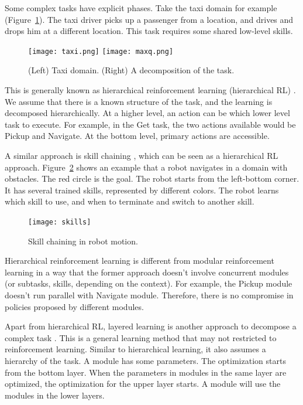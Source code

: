 \documentclass[12pt]{report}	%
\theoremstyle{definition}
\theoremstyle{remark}
\providecommand{\DIFadd}[1]{{\protect\color{blue}\uwave{#1}}} %
\providecommand{\DIFaddbegin}{} %
\providecommand{\DIFaddend}{} %
\begin{document}
Some complex tasks have explicit phases. Take the taxi domain for example
(Figure~\ref{fig:taxi}). The taxi driver picks up a passenger from a location,
and drives and drops him at a different location. This task requires some shared
low-level skills.

\begin{figure}[h]
\centering
\texttt{[image: taxi.png]}
\texttt{[image: maxq.png]}
\caption{(Left) Taxi domain. (Right) A decomposition of the task.}
\label{fig:taxi}
\end{figure}

This is generally known as hierarchical reinforcement learning (hierarchical RL)
\cite{dietterich2000hierarchical}.
We assume that there is a known structure of the task, and the
learning is decomposed hierarchically. At a higher level, an action can be
which lower level task to execute. For example, in the Get task, the two actions
available would be Pickup and Navigate. At the bottom level, primary actions are
accessible.

A similar approach is skill chaining \cite{konidaris2009skill}, which can
be seen as a hierarchical RL approach. Figure~\ref{fig:skills} shows
an example that a robot navigates in a domain with obstacles. The red circle is
the goal. The robot starts from the left-bottom corner. It has several trained
skills, represented by different colors. The robot learns which skill to use,
and when to terminate and switch to another skill.

\begin{figure}[h]
\centering
\texttt{[image: skills]}
\caption{Skill chaining in robot motion.}
\label{fig:skills}
\end{figure}

Hierarchical reinforcement learning is different from modular reinforcement
learning in a way that the former approach doesn't involve concurrent modules
(or subtasks, skills, depending on the context).
For example, the Pickup module doesn't run \DIFaddbegin \DIFadd{in }\DIFaddend parallel with Navigate module.
Therefore, there is no compromise in policies proposed by different modules.

Apart from hierarchical RL, layered learning is another approach to decompose a
complex task \cite{stone2000layered}. This is a general learning method that may
not \DIFaddbegin \DIFadd{be }\DIFaddend restricted to reinforcement learning. Similar to hierarchical learning, it
also assumes a hierarchy of the task. A module has some parameters. The
optimization starts from the bottom layer. When the parameters in modules in
the same layer are optimized, the optimization for the upper layer starts. A
module will use the modules in the lower layers.
\end{document}
